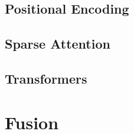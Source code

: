 \subsection{Positional Encoding}


\subsection{Sparse Attention}


\subsection{Transformers}


\section{Fusion}
